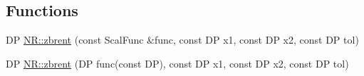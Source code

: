 \subsection*{Functions}
\begin{DoxyCompactItemize}
\item 
DP \mbox{\hyperlink{namespaceNR_ac5818de945dc13deb3bf29c2eda04523}{N\+R\+::zbrent}} (const Scal\+Func \&func, const DP x1, const DP x2, const DP tol)
\item 
DP \mbox{\hyperlink{namespaceNR_a65e397db7c70abaac50b73cd18a8b8ae}{N\+R\+::zbrent}} (DP func(const DP), const DP x1, const DP x2, const DP tol)
\end{DoxyCompactItemize}
